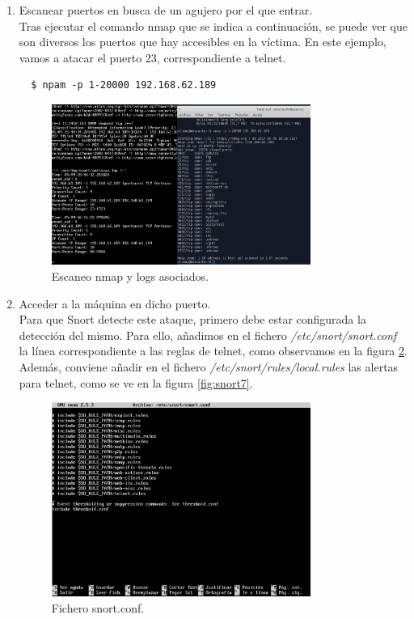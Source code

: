 \documentclass[a4,12pt,onecolum]{article}
\begin{document}
\begin{enumerate}
  \item Escanear puertos en busca de un agujero por el que entrar. \\

  Tras ejecutar el comando nmap que se indica a continuación, se puede ver que son diversos los puertos que hay accesibles en la víctima. En este ejemplo, vamos a atacar el puerto 23, correspondiente a telnet.

  \begin{verbatim}
  $ npam -p 1-20000 192.168.62.189
  \end{verbatim}

  \begin{figure}[H]
  \centering
  \includegraphics[width=0.8\textwidth]{./images/SnortEscaneoNmap.png}
  \caption{Escaneo nmap y logs asociados.}
  \label{fig:snort5}
  \end{figure}

  \item Acceder a la máquina en dicho puerto. \\

  Para que Snort detecte este ataque, primero debe estar configurada la detección del mismo. Para ello, añadimos en el fichero \emph{/etc/snort/snort.conf} la línea correspondiente a las reglas de telnet, como observamos en la figura \ref{fig:snort6}. \\

  Además, conviene añadir en el fichero \emph{/etc/snort/rules/local.rules} las alertas para telnet, como se ve en la figura \ref{fig:snort7}.

  \begin{figure}[H]
  \centering
  \includegraphics[width=0.8\textwidth]{./images/SnortRules.png}
  \caption{Fichero snort.conf.}
  \label{fig:snort6}
  \end{figure}


\end{enumerate}
\end{document}
